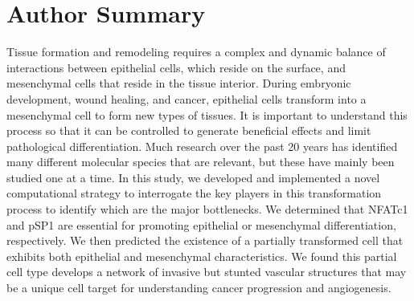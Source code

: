 \documentclass[11pt,letterpaper]{article}
\begin{document}
\section*{Author Summary}
Tissue formation and remodeling requires a complex and dynamic balance of interactions between epithelial cells, which reside on the surface, and mesenchymal cells that reside in the tissue interior. During embryonic development, wound healing, and cancer, epithelial cells transform into a mesenchymal cell to form new types of tissues.
It is important to understand this process so that it can be controlled to generate beneficial effects and limit pathological differentiation.
Much research over the past 20 years has identified many different molecular species that are relevant, but these have mainly been studied one at a time.
In this study, we developed and implemented a novel computational strategy to interrogate the key players in this transformation process to identify which are the major bottlenecks.
We determined that NFATc1 and pSP1 are essential for promoting epithelial or mesenchymal differentiation, respectively.
We then predicted the existence of a partially transformed cell that exhibits both epithelial and mesenchymal characteristics.
We found this partial cell type develops a network of invasive but stunted vascular structures that may be a unique cell target for understanding cancer progression and angiogenesis.

\linenumbers
\end{document}
